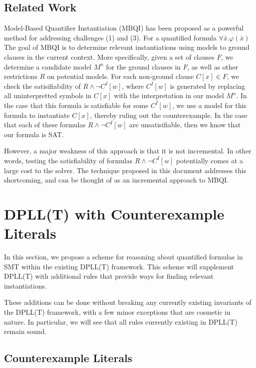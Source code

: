 \documentclass{llncs}
\begin{document}
\subsection{Related Work}

Model-Based Quantifier Instantiation (MBQI) has been proposed as a powerful method for addressing challenges (1) and (3).
For a quantified formula $\forall \bar{x}. \varphi(\bar{x})$
The goal of MBQI is to determine relevant instantiations using models to ground clauses in the current context.
More specifically, given a set of clauses $F$, we determine a candidate model $M^n$ for the ground clauses in $F$, as well as other restrictions $R$ on potential models.
For each non-ground clause $C[x] \in F$, we check the satisifiability of $R \wedge \neg C^I[w]$, where $C^I[w]$ is generated by replacing all uninterpretted symbols in $C[x]$ with the interpretation in our model $M^n$.
In the case that this formula is satisfiable for some $C^I[w]$, we use a model for this formula to instantiate $C[x]$, thereby ruling out the counterexample.
In the case that each of these formulas $R \wedge \neg C^I[w]$ are unsatisifiable, then we know that our formula is SAT.

However, a major weakness of this approach is that it is not incremental.
In other words, testing the satisfiability of formulas $R \wedge \neg C^I[w]$ potentially comes at a large cost to the solver.
The technique proposed in this document addresses this shortcoming, and can be thought of as an incremental approach to MBQI.

\section{DPLL(T) with Counterexample Literals}
\label{dpll-ce-lit}

In this section, we propose a scheme for reasoning about quantified formulas in SMT within the existing DPLL(T) framework.
This scheme will supplement DPLL(T) with additional rules that provide ways for finding relevant instantiations.

These additions can be done without breaking any currently existing invariants of the DPLL(T) framework, with a few minor exceptions that are cosmetic in nature.
In particular, we will see that all rules currently existing in DPLL(T) remain sound.

\subsection{Counterexample Literals}
\end{document}
